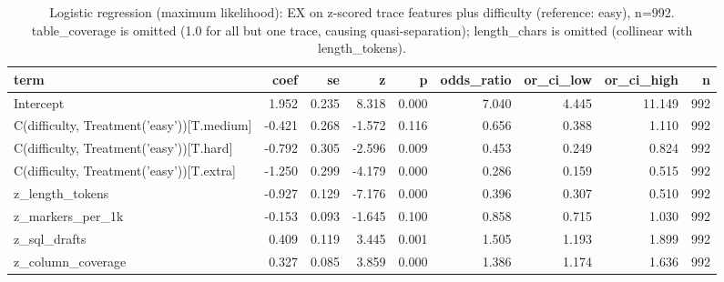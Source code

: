 \begin{table}[htbp]
\caption{Logistic regression (maximum likelihood): EX on z-scored trace features plus difficulty (reference: easy), n=992. table\_coverage is omitted (1.0 for all but one trace, causing quasi-separation); length\_chars is omitted (collinear with length\_tokens).}
\label{tab:task2_logit}
\begin{tabular}{lrrrrrrrr}
\toprule
term & coef & se & z & p & odds\_ratio & or\_ci\_low & or\_ci\_high & n \\
\midrule
Intercept & 1.952 & 0.235 & 8.318 & 0.000 & 7.040 & 4.445 & 11.149 & 992 \\
C(difficulty, Treatment('easy'))[T.medium] & -0.421 & 0.268 & -1.572 & 0.116 & 0.656 & 0.388 & 1.110 & 992 \\
C(difficulty, Treatment('easy'))[T.hard] & -0.792 & 0.305 & -2.596 & 0.009 & 0.453 & 0.249 & 0.824 & 992 \\
C(difficulty, Treatment('easy'))[T.extra] & -1.250 & 0.299 & -4.179 & 0.000 & 0.286 & 0.159 & 0.515 & 992 \\
z_length_tokens & -0.927 & 0.129 & -7.176 & 0.000 & 0.396 & 0.307 & 0.510 & 992 \\
z_markers_per_1k & -0.153 & 0.093 & -1.645 & 0.100 & 0.858 & 0.715 & 1.030 & 992 \\
z_sql_drafts & 0.409 & 0.119 & 3.445 & 0.001 & 1.505 & 1.193 & 1.899 & 992 \\
z_column_coverage & 0.327 & 0.085 & 3.859 & 0.000 & 1.386 & 1.174 & 1.636 & 992 \\
\bottomrule
\end{tabular}
\end{table}

